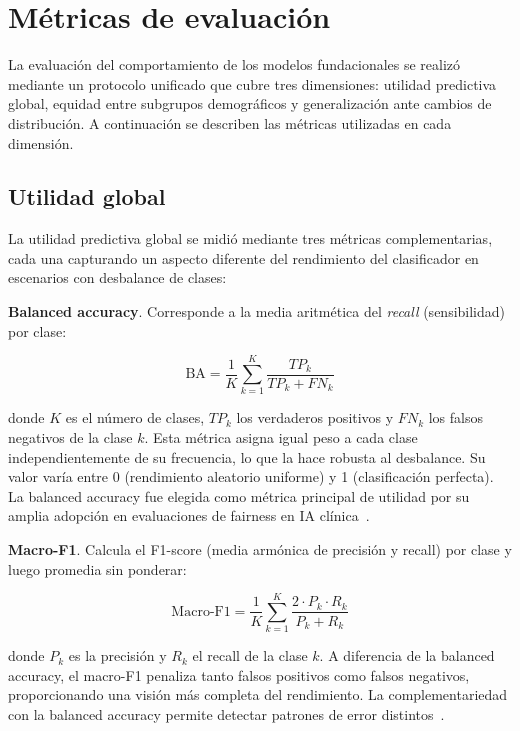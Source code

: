 \section{Métricas de evaluación}
\label{sec:metricas_evaluacion}

La evaluación del comportamiento de los modelos fundacionales se realizó mediante un protocolo unificado que cubre tres dimensiones: utilidad predictiva global, equidad entre subgrupos demográficos y generalización ante cambios de distribución. A continuación se describen las métricas utilizadas en cada dimensión.

\subsection{Utilidad global}
\label{sec:utilidad_global}

La utilidad predictiva global se midió mediante tres métricas complementarias, cada una capturando un aspecto diferente del rendimiento del clasificador en escenarios con desbalance de clases:

\textbf{Balanced accuracy}. Corresponde a la media aritmética del \textit{recall} (sensibilidad) por clase:

\begin{equation}
    \text{BA} = \frac{1}{K} \sum_{k=1}^{K} \frac{TP_k}{TP_k + FN_k}
    \label{eq:balanced_accuracy}
\end{equation}

donde $K$ es el número de clases, $TP_k$ los verdaderos positivos y $FN_k$ los falsos negativos de la clase $k$. Esta métrica asigna igual peso a cada clase independientemente de su frecuencia, lo que la hace robusta al desbalance. Su valor varía entre 0 (rendimiento aleatorio uniforme) y 1 (clasificación perfecta). La balanced accuracy fue elegida como métrica principal de utilidad por su amplia adopción en evaluaciones de fairness en IA clínica~\parencite{tertytchny2024balanced}.

\textbf{Macro-F1}. Calcula el F1-score (media armónica de precisión y recall) por clase y luego promedia sin ponderar:

\begin{equation}
    \text{Macro-F1} = \frac{1}{K} \sum_{k=1}^{K} \frac{2 \cdot P_k \cdot R_k}{P_k + R_k}
    \label{eq:macro_f1}
\end{equation}

donde $P_k$ es la precisión y $R_k$ el recall de la clase $k$. A diferencia de la balanced accuracy, el macro-F1 penaliza tanto falsos positivos como falsos negativos, proporcionando una visión más completa del rendimiento. La complementariedad con la balanced accuracy permite detectar patrones de error distintos~\parencite{chen2023algorithmic}.

